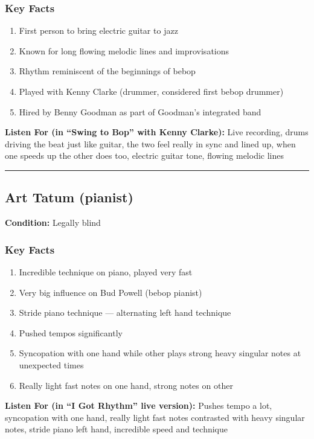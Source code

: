 \documentclass[11pt, letterpaper]{article}
\begin{document}
\subsubsection*{Key Facts}
\begin{enumerate}
    \item First person to bring electric guitar to jazz
    \item Known for long flowing melodic lines and improvisations
    \item Rhythm reminiscent of the beginnings of bebop
    \item Played with Kenny Clarke (drummer, considered first bebop drummer)
    \item Hired by Benny Goodman as part of Goodman's integrated band
\end{enumerate}

\textbf{Listen For (in ``Swing to Bop'' with Kenny Clarke):} Live recording, drums driving the beat just like guitar, the two feel really in sync and lined up, when one speeds up the other does too, electric guitar tone, flowing melodic lines

\bigskip
\textcolor{rulecolor}{\rule{\textwidth}{0.2pt}}

\subsection{Art Tatum (pianist)}

\textbf{Condition:} Legally blind

\subsubsection*{Key Facts}
\begin{enumerate}
    \item Incredible technique on piano, played very fast
    \item Very big influence on Bud Powell (bebop pianist)
    \item Stride piano technique --- alternating left hand technique
    \item Pushed tempos significantly
    \item Syncopation with one hand while other plays strong heavy singular notes at unexpected times
    \item Really light fast notes on one hand, strong notes on other
\end{enumerate}

\textbf{Listen For (in ``I Got Rhythm'' live version):} Pushes tempo a lot, syncopation with one hand, really light fast notes contrasted with heavy singular notes, stride piano left hand, incredible speed and technique
\end{document}

